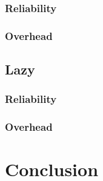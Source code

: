                 \subsubsection{Reliability}
                \subsubsection{Overhead}
            \subsection{Lazy}
                \subsubsection{Reliability}
                \subsubsection{Overhead}
                
\section{Conclusion}